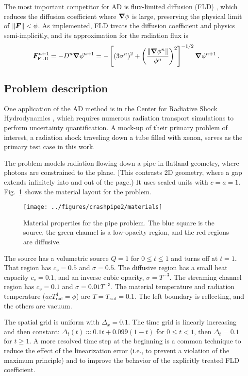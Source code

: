 \documentclass[11pt,letter,twoside]{mc2011}
\begin{document}
The most important competitor for AD is flux-limited diffusion (FLD)
\cite{Ols2000}, which
reduces the diffusion coefficient where $\bm{\nabla} \phi$ is large, preserving the
physical limit of $\left\| \bm{F} \right\| < \phi$.
As implemented, FLD treats the diffusion
coefficient and physics semi-implicitly, and its approximation for the
radiation flux is
\begin{equation*}
  \bm{F}_\text{FLD}^{n+1} = - D^{n} \bm{\nabla} \phi^{n+1}  = -\left[ (3\sigma^{n})^2
  + \left( \frac{\left\| \bm{\nabla} \phi^{n} \right\|}{\phi^{n}}  \right)^2 \right]^{-1/2}
  \bm{\nabla} \phi^{n+1}\,.
\end{equation*}


\subsection{Problem description}
One application of the AD method is in the Center for Radiative Shock
Hydrodynamics \cite{Crash2010}, which requires numerous radiation transport simulations
to perform uncertainty quantification. A mock-up of their primary problem
of interest, a radiation shock traveling down a tube filled with xenon, serves
as the primary test case in this work.

The problem models radiation flowing down a pipe in flatland geometry, where
photons are constrained to the plane. (This contrasts 2D geometry, where a gap
extends infinitely into and out of the page.) It uses scaled units with $c=a=1$. Fig.~\ref{fig:crashpipeMaterial}
shows the material layout for the problem.
\begin{figure}[htb]
  \centering
  \texttt{[image: ../figures/crashpipe2/materials]}
  \caption{Material properties for the pipe problem. The blue square is the
  source, the green channel is a low-opacity region, and the red regions are
  diffusive.}
  \label{fig:crashpipeMaterial}
\end{figure}
The source has a volumetric source
$Q=1$ for $0 \le t \le 1$ and turns off at $t=1$.
That region has $c_v=0.5$ and
$\sigma=0.5$. The diffusive region has a small heat capacity $c_v=0.1$, and an
inverse cubic opacity, $\sigma=T^{-3}$. The streaming channel region has
$c_v=0.1$ and $\sigma=0.01 T^{-3}$. The material temperature and radiation
temperature ($a c T_\text{rad}^4 = \phi$) are $T=T_\text{rad}=0.1$. The left
boundary is reflecting, and the others are vacuum.

The spatial grid is uniform with $\Delta_x=0.1$. The time grid is linearly
increasing and then constant: $\Delta_t(t)\approx 0.1 t + 0.099 (1 - t)$ for $0
\le t < 1$, then $\Delta_t=0.1$ for $t \ge 1$. A more resolved time step at
the beginning is a common technique to reduce the effect of the linearization
error (i.e., to prevent a violation of the maximum principle) and to improve
the behavior of the explicitly treated FLD coefficient.
\end{document}
